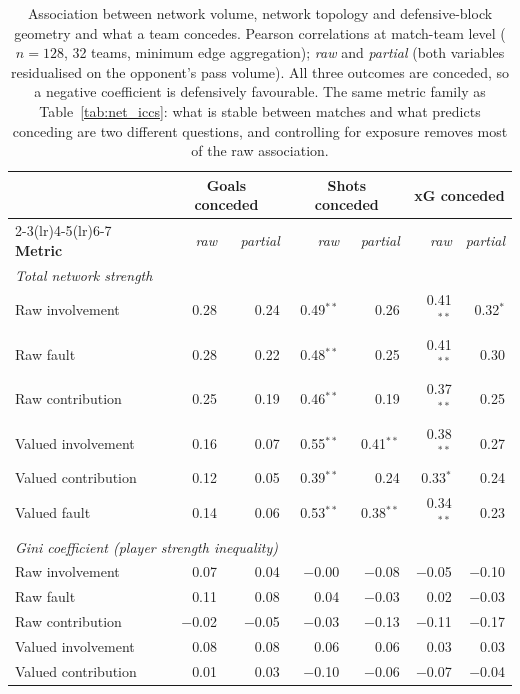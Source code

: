 \begin{table}[ht]
\centering
\caption{Association between network volume, network topology and
defensive-block geometry and what a team concedes. Pearson correlations at
match-team level ($n=128$, 32 teams, minimum edge
aggregation); \textit{raw} and \textit{partial} (both variables residualised on
the opponent's pass volume). All three outcomes are conceded, so a negative
coefficient is defensively favourable. The same metric family as
Table~\ref{tab:net_iccs}: what is stable between matches and what predicts
conceding are two different questions, and controlling for exposure removes
most of the raw association.}
\label{tab:net_outcomes}
\begin{tabular}{lrrrrrr}
\toprule
 & \multicolumn{2}{c}{\textbf{Goals conceded}} & \multicolumn{2}{c}{\textbf{Shots conceded}} & \multicolumn{2}{c}{\textbf{xG conceded}} \\
\cmidrule(lr){2-3}\cmidrule(lr){4-5}\cmidrule(lr){6-7}
\textbf{Metric} & \textit{raw} & \textit{partial} & \textit{raw} & \textit{partial} & \textit{raw} & \textit{partial} \\
\midrule
\multicolumn{7}{l}{\textit{Total network strength}} \\
\quad Raw involvement & 0.28 & 0.24 & 0.49$^{**}$ & 0.26 & 0.41$^{**}$ & 0.32$^{*}$ \\
\quad Raw fault & 0.28 & 0.22 & 0.48$^{**}$ & 0.25 & 0.41$^{**}$ & 0.30 \\
\quad Raw contribution & 0.25 & 0.19 & 0.46$^{**}$ & 0.19 & 0.37$^{**}$ & 0.25 \\
\quad Valued involvement & 0.16 & 0.07 & 0.55$^{**}$ & 0.41$^{**}$ & 0.38$^{**}$ & 0.27 \\
\quad Valued contribution & 0.12 & 0.05 & 0.39$^{**}$ & 0.24 & 0.33$^{*}$ & 0.24 \\
\quad Valued fault & 0.14 & 0.06 & 0.53$^{**}$ & 0.38$^{**}$ & 0.34$^{**}$ & 0.23 \\
\midrule
\multicolumn{7}{l}{\textit{Gini coefficient (player strength inequality)}} \\
\quad Raw involvement & 0.07 & 0.04 & $-$0.00 & $-$0.08 & $-$0.05 & $-$0.10 \\
\quad Raw fault & 0.11 & 0.08 & 0.04 & $-$0.03 & 0.02 & $-$0.03 \\
\quad Raw contribution & $-$0.02 & $-$0.05 & $-$0.03 & $-$0.13 & $-$0.11 & $-$0.17 \\
\quad Valued involvement & 0.08 & 0.08 & 0.06 & 0.06 & 0.03 & 0.03 \\
\quad Valued contribution & 0.01 & 0.03 & $-$0.10 & $-$0.06 & $-$0.07 & $-$0.04 \\

\end{tabular}
\end{table}
